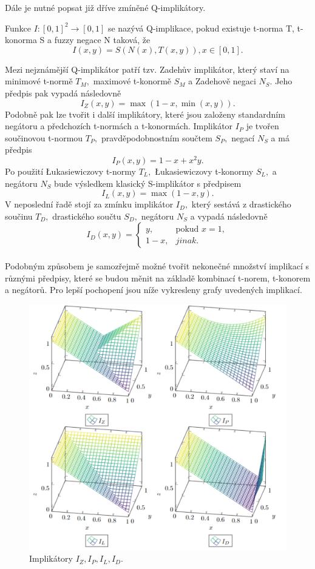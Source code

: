 Dále je nutné popsat již dříve zmíněné Q-implikátory.
\begin{definition}
    \cite{Springer}
    Funkce $I: [0,1]^2 \rightarrow [0,1]$ se nazývá Q-implikace, pokud existuje t-norma T, t-konorma S a fuzzy negace N taková, že $$I(x,y) = S(N(x),T(x,y)), x \in [0,1].$$
\end{definition}
Mezi nejznámější Q-implikátor patří tzv. Zadeh\r uv implikátor, který staví na minimové t-normě $T_M,$ maximové t-konormě $S_M$ a Zadehově negaci $N_S$. Jeho předpis pak vypadá následovně $$I_Z(x,y) = \max(1-x, \min(x,y)).$$ Podobně pak lze tvořit i další implikátory, které jsou založeny standardním negátoru a předchozích t-normách a t-konormách. Implikátor $I_P$ je tvořen součinovou t-normou $T_P,$ pravděpodobnostním součtem $S_P,$ negací $N_S$ a má předpis $$I_P(x,y) = 1-x+x^2y.$$  Po použití Łukasiewiczovy t-normy $T_L,$ Łukasiewiczovy t-konormy $S_L,$ a negátoru $N_S$ bude výsledkem klasický S-implikátor s předpisem $$I_L(x,y) = \max(1-x, y).$$ V neposlední řadě stojí za zmínku implikátor $I_D,$ který sestává z drastického součinu $T_D,$ drastického součtu $S_D,$ negátoru $N_S$ a vypadá následovně $$I_D(x,y) = \begin{cases}  y, & \mbox{pokud } x = 1,\\
                1 - x, &  jinak.  \end{cases}$$\\ 
Podobným zp\r usobem je samozřejmě možné tvořit nekonečné množství implikací s r\r uznými předpisy, které se budou měnit na základě kombinací t-norem, t-konorem a negátor\r u. Pro lepší pochopení jsou níže vykresleny grafy uvedených implikací.
\begin{figure}[H]
\caption{Implikátory $I_Z, I_P, I_L, I_D.$}
                \hspace{-1cm}
                \includegraphics[scale=0.6]{template-fig/impl3.pdf}
                \centering
            \end{figure}

